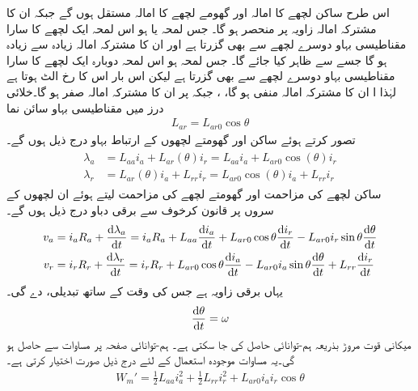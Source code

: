 اس طرح ساکن لچھے کا امالہ  اور گھومے لچھے کا امالہ  مستقل ہوں گے جبکہ ان کا مشترکہ امالہ  زاویہ  پر منحصر ہو گا۔ جس لمحہ  یا  ہو اس لمحہ  ایک لچھے کا سارا مقناطیسی بہاو دوسرے لچھے سے بھی گزرتا ہے اور ان کا مشترکہ امالہ زیادہ سے زیادہ ہو گا جسے  سے ظاہر کیا جائے گا۔ جس لمحہ   ہو اس لمحہ دوبارہ ایک لچھے کا سارا مقناطیسی بہاو دوسرے لچھے سے بھی گزرتا ہے لیکن اس بار اس کا رخ الٹ ہوتا ہے  لہٰذا ا ان کا مشترکہ امالہ منفی ہو گا، ،  جبکہ   پر  ان کا مشترکہ امالہ صفر ہو گا۔خلائی درز میں  مقناطیسی بہاو سائن نما
\begin{align}
L_{ar}=L_{ar0} \cos \theta
\end{align}
تصور کرتے ہوئے  ساکن اور گھومتے لچھوں کے ارتباط بہاو درج ذیل ہوں گے۔
\begin{gather}
\begin{aligned}
\lambda_a&=L_{aa} i_a+L_{ar}(\theta) i_r=L_{aa} i_a+L_{ar0} \cos (\theta) i_r\\
\lambda_r&=L_{ar}(\theta) i_a+L_{rr} i_r=L_{ar0} \cos (\theta) i_a+L_{rr} i_r
\end{aligned}
\end{gather}
ساکن لچھے کی مزاحمت  اور گھومتے لچھے کی مزاحمت  لیتے ہوئے ان لچھوں کے سروں پر  قانون کرخوف سے برقی دباو درج ذیل ہوں گے۔
\begin{gather}
\begin{aligned}
v_a&=i_a R_a +\frac{\dif \lambda_a}{\dif t}=i_a R_a+L_{aa} \frac{\dif i_a}{\dif t}+L_{ar0} \cos \theta \frac{\dif i_r}{\dif t}-L_{ar0}  i_r \sin \theta  \frac{\dif \theta}{\dif t}\\
v_r&=i_r R_r +\frac{\dif \lambda_r}{\dif t}=i_r R_r+L_{ar0} \cos \theta \frac{\dif i_a}{\dif t}-L_{ar0} i_a \sin \theta  \frac{\dif \theta}{\dif t}+L_{rr} \frac{\dif i_r}{\dif t}
\end{aligned}
\end{gather}
یہاں  برقی زاویہ ہے جس کی وقت کے ساتھ  تبدیلی،    دے گی۔
\begin{align}
\frac{\dif \theta}{\dif t}=\omega
\end{align}
میکانی قوت مروڑ بذریعہ ہم-توانائی حاصل کی جا سکتی ہے۔ ہم-توانائی صفحہ  پر مساوات   سے حاصل ہو گی۔یہ مساوات موجودہ استعمال کے لئے درج ذیل صورت اختیار کرتی ہے۔
\begin{align}
W_m'=\frac{1}{2} L_{aa} i_a^2+\frac{1}{2} L_{rr} i_r^2+L_{ar0} i_a i_r \cos \theta
\end{align}
